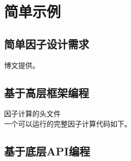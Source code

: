 \chapter{简单示例}
\section{简单因子设计需求}
\large{博文提供}\normalsize。
\section{基于高层框架编程}


\large{因子计算的头文件}\normalsize \\




一个可以运行的完整因子计算代码如下。


\section{基于底层API编程}

